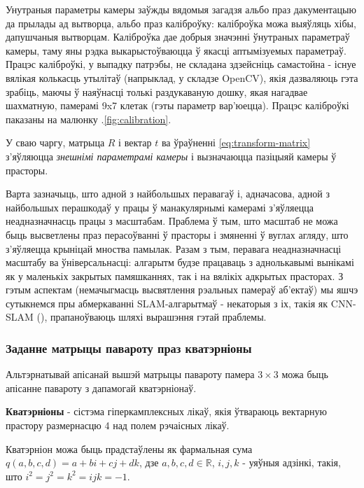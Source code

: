 Унутраныя параметры камеры заўжды вядомыя загадзя альбо праз дакументацыю да прылады ад
вытворца, альбо праз каліброўку: каліброўка можа выяўляць хібы, дапушчаныя вытворцам.
Каліброўка дае добрыя значэнні ўнутраных параметраў
камеры, таму яны рэдка выкарыстоўваюцца ў якасці аптымізуемых параметраў.
Працэс каліброўкі, у выпадку патрэбы, не складана здзейсніць самастойна - існуе вялікая колькасць утылітаў
(напрыклад, у складзе OpenCV), якія дазваляюць гэта зрабіць, маючы ў наяўнасці толькі раздукаваную
дошку, якая нагадвае шахматную, памерамі 9x7 клетак (гэты параметр вар'юецца).
Працэс каліброўкі паказаны на малюнку \cursection.\ref{fig:calibration}.

У сваю чаргу, матрыца $R$ і вектар $t$ ва ўраўненні \ref{eq:transform-matrix} з'яўляюцца
\textit{знешнімі параметрамі камеры} і вызначаюцца пазіцыяй камеры ў прасторы.

Варта зазначыць, што адной з найбольшых перавагаў і, адначасова, адной з найбольшых
перашкодаў у працы ў манакулярнымі камерамі з'яўляецца неадназначнасць працы з масштабам.
Праблема ў тым, што масштаб не можа быць высветлены праз перасоўванні ў прасторы і
змяненні ў вуглах агляду, што з'яўляецца крыніцай мноства памылак. Разам з тым,
перавага неадназначнасці масштабу ва ўніверсальнасці: алгарытм будзе працаваць
з аднолькавымі вынікамі як у маленькіх закрытых памяшканнях, так і на вялікіх
адкрытых прасторах. З гэтым аспектам (немачыгмасць высвятлення рэальных памераў аб'ектаў)
мы яшчэ сутыкнемся пры абмеркаванні SLAM-алгарытмаў - некаторыя з іх, такія як
CNN-SLAM (\cite{DBLP:journals/corr/TatenoTLN17}), прапаноўваюць шляхі вырашэння гэтай праблемы.

\subsubsection*{Заданне матрыцы павароту праз кватэрніоны}

\vspace{5mm}

Альтэрнатывай апісанай вышэй матрыцы павароту памера $3 \times 3$
можа быць апісанне павароту з дапамогай кватэрніонаў.

{\bf Кватэрніоны} - сістэма гіперкамплексных лікаў,
якія ўтвараюць вектарную прастору размернасцю 4 над полем рэчаісных лікаў.

Кватэрніон можа быць прадстаўлены як фармальная сума
$q(a, b, c, d) = a + bi + cj + dk$, дзе $a, b, c, d \in\mathbb{R}$, $i, j, k$ -
уяўныя адзінкі, такія, што $i^2 = j^2 = k^2 = ijk = -1$.


